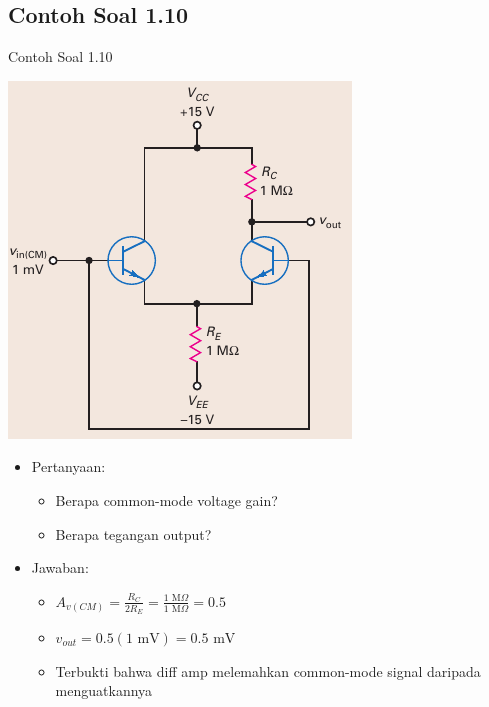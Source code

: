 \documentclass[aspectratio=169]{beamer}
\begin{document}
\subsection{Contoh Soal 1.10}
\begin{frame}{Contoh Soal 1.10}
	\begin{multicols}{2}
		\begin{center}
			\includegraphics[height=0.7\textheight]{gambar/01.fig21}
		\end{center}
		\columnbreak
		\begin{itemize}
			\item Pertanyaan:
			\begin{itemize}
				\item Berapa common-mode voltage gain?
				\item Berapa tegangan output?
			\end{itemize}
			\item Jawaban:
			\begin{itemize}
				\item $ A_{v(CM)} = \frac{R_C}{2R_E} = \frac{1 \text{ M}\Omega}{1 \text{ M}\Omega} = 0.5 $
				\item $ v_{out} = 0.5(1 \text{ mV}) = 0.5 \text{ mV} $
				\item Terbukti bahwa diff amp melemahkan common-mode signal daripada menguatkannya
			\end{itemize}
		\end{itemize}
	\end{multicols}
\end{frame}
\end{document}

